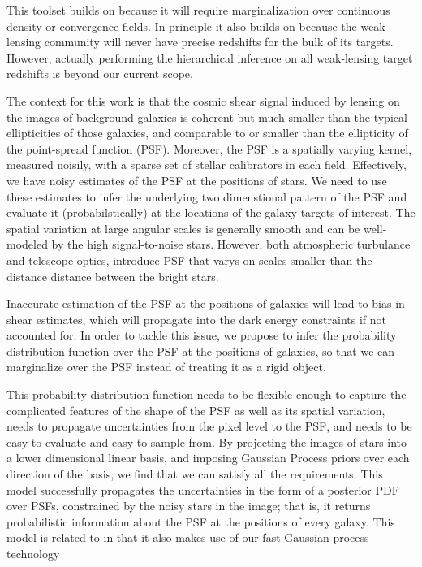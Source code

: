 \documentclass[12pt]{article}
\begin{document}
This toolset builds on  because it will require
marginalization over continuous density or convergence fields.
In principle it also builds on  because the weak
lensing community will never have precise redshifts for the bulk of
its targets.
However, actually performing the hierarchical inference on all
weak-lensing target redshifts is beyond our current scope.

The context for this work is that the cosmic shear signal induced
by lensing on the images of background galaxies is coherent but much
smaller than the typical ellipticities of those galaxies, and comparable
to or smaller than the ellipticity of the point-spread function (PSF).
Moreover, the PSF is a spatially varying kernel, measured noisily,
with a sparse set of stellar calibrators in each field.
Effectively, we have noisy estimates of the PSF at the positions of
stars. We need to use these estimates to infer the underlying two
dimenstional pattern of the PSF and evaluate it (probabilstically) at
the locations of the galaxy targets of interest.
The spatial variation at large angular scales is 
generally smooth and can be well-modeled by the high signal-to-noise stars. However, both atmospheric
turbulance and telescope optics, introduce PSF that varys on scales smaller than the distance
distance between the bright stars. 

Inaccurate estimation of the PSF at the positions of galaxies will lead to bias in shear estimates,
which will propagate into the dark energy constraints if not accounted for. In order to
tackle this issue, we propose to infer the probability distribution function over the PSF
at the positions of galaxies, so that we can marginalize over the PSF instead of treating it 
as a rigid object.

This probability distribution function needs to be flexible enough to capture the complicated 
features of the shape of the PSF as well as its spatial variation, needs to propagate uncertainties
from the pixel level to the PSF, and needs to be easy to evaluate and easy to sample from. By 
projecting the images of stars into a lower dimensional linear basis, and imposing Gaussian Process priors 
over each direction of the basis, we find that we can satisfy all the requirements. This model successfully propagates
the uncertainties in the form of a posterior PDF over PSFs, constrained by the noisy stars in the image; 
that is, it returns probabilistic information about the PSF at the positions of every galaxy.
This model is related to  in that it also makes use
of our fast Gaussian process technology
\end{document}
